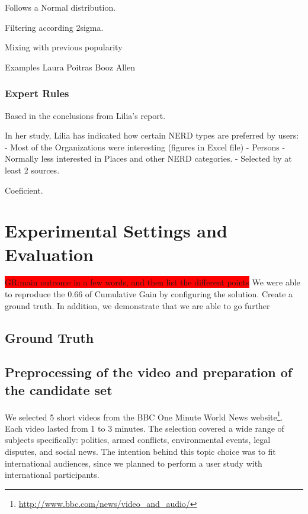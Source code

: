 \documentclass{llncs}
\newcommand{\todo}[1]{\colorbox{red}{#1}}
\begin{document}
Follows a Normal distribution.

Filtering according 2sigma.

Mixing with  previous popularity

Examples
Laura Poitras
Booz Allen



\subsubsection{Expert Rules}
Based in the conclusions from Lilia's report. 

In her study, Lilia has indicated how certain NERD types are preferred by users:
- Most of the Organizations were interesting (figures in Excel file)
- Persons
- Normally less interested in Places and other NERD categories.
- Selected by at least 2 sources.


Coeficient.


\section{Experimental Settings and Evaluation}
\label{sec:Evaluation}
\todo{GR:main outcome in a few words, and then list the different points}
We were able to reproduce the 0.66 of Cumulative Gain by configuring the solution. Create a ground truth. In addition, we demonstrate that we are able to go further 

\subsection{Ground Truth}
\subsection{Preprocessing of the video and preparation of the candidate set}

We selected 5 short videos from the BBC One Minute World News website\footnote{\url{http://www.bbc.com/news/video_and_audio/}}. Each video lasted from 1 to 3 minutes. The selection covered a wide range of subjects specifically: politics, armed conflicts, environmental events, legal disputes, and social news. The intention behind this topic choice was to fit international audiences, since we planned to perform a user study with international participants. 
\end{document}
